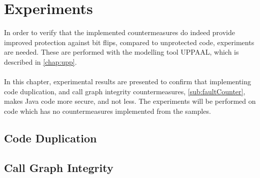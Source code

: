\chapter{Experiments}
In order to verify that the implemented countermeasures do indeed provide improved protection against bit flips, compared to unprotected code, experiments are needed. These are performed with the modelling tool UPPAAL, which is described in \cref{chap:upp}.\\\\
In this chapter, experimental results are presented to confirm that implementing code duplication, and call graph integrity countermeasures, \cref{sub:faultCounter}, makes Java code more secure, and not less. The experiments will be performed on code which has no countermeasures implemented from the \jc samples.
%
\section{Code Duplication}

\section{Call Graph Integrity}

